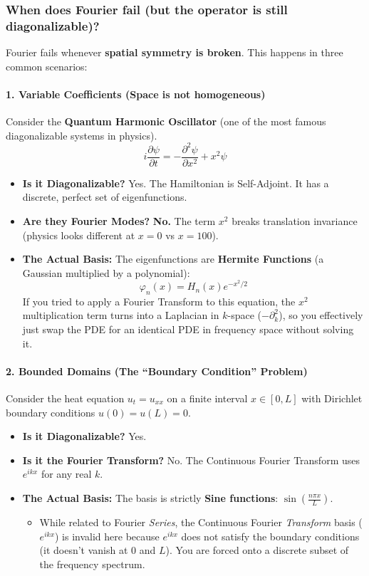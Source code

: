 \documentclass[oneside]{book}
\renewcommand{\phi}{\varphi}
\begin{document}
\subsubsection*{When does Fourier fail (but the operator is still diagonalizable)?}
Fourier fails whenever \textbf{spatial symmetry is broken}. This happens in three common scenarios:

\paragraph{1. Variable Coefficients (Space is not homogeneous)}
Consider the \textbf{Quantum Harmonic Oscillator} (one of the most famous diagonalizable systems in physics).
\[ i \frac{\partial \psi}{\partial t} = -\frac{\partial^2 \psi}{\partial x^2} + x^2 \psi \]
\begin{itemize}
    \item \textbf{Is it Diagonalizable?} Yes. The Hamiltonian is Self-Adjoint. It has a discrete, perfect set of eigenfunctions.
    \item \textbf{Are they Fourier Modes?} \textbf{No.} The term $x^2$ breaks translation invariance (physics looks different at $x=0$ vs $x=100$).
    \item \textbf{The Actual Basis:} The eigenfunctions are \textbf{Hermite Functions} (a Gaussian multiplied by a polynomial):
    \[ \phi_n(x) = H_n(x) e^{-x^2/2} \]
    If you tried to apply a Fourier Transform to this equation, the $x^2$ multiplication term turns into a Laplacian in $k$-space ($-\partial_k^2$), so you effectively just swap the PDE for an identical PDE in frequency space without solving it.
\end{itemize}

\paragraph{2. Bounded Domains (The ``Boundary Condition'' Problem)}
Consider the heat equation $u_t = u_{xx}$ on a finite interval $x \in [0, L]$ with Dirichlet boundary conditions $u(0)=u(L)=0$.
\begin{itemize}
    \item \textbf{Is it Diagonalizable?} Yes.
    \item \textbf{Is it the Fourier Transform?} No. The Continuous Fourier Transform uses $e^{ikx}$ for any real $k$.
    \item \textbf{The Actual Basis:} The basis is strictly \textbf{Sine functions}: $\sin(\frac{n\pi x}{L})$.
    \begin{itemize}
        \item While related to Fourier \textit{Series}, the Continuous Fourier \textit{Transform} basis ($e^{ikx}$) is invalid here because $e^{ikx}$ does not satisfy the boundary conditions (it doesn't vanish at $0$ and $L$). You are forced onto a discrete subset of the frequency spectrum.
    \end{itemize}
\end{itemize}
\end{document}
